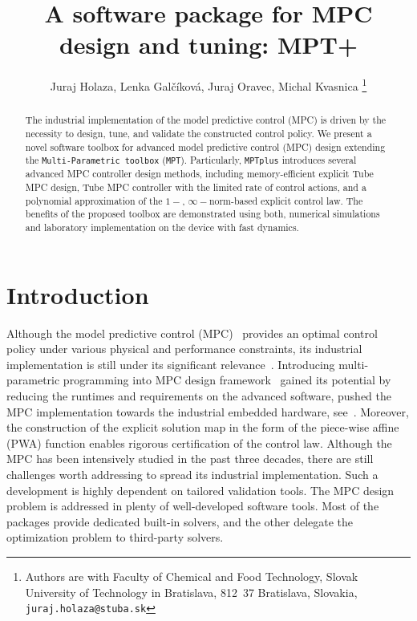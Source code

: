 \documentclass[letterpaper, 10 pt, conference]{ieeeconf}
\title{\LARGE \bf
	A software package for MPC design and tuning: MPT+
}
\author{Juraj Holaza, Lenka Gal\v{c}\'{i}kov\'{a}, Juraj Oravec, Michal Kvasnica
	\thanks{Authors are with Faculty of Chemical and Food Technology,
		Slovak University of Technology in Bratislava, 812~37 Bratislava, Slovakia,
		\texttt{juraj.holaza@stuba.sk}}
}
\begin{document}
	
	
	
	\maketitle
	\thispagestyle{empty}
	\pagestyle{empty}
	
	\begin{abstract}
		
		The industrial implementation of the model predictive control (MPC) is driven by the necessity to design, tune, and validate the constructed control policy. 
		We present a novel software toolbox for advanced model predictive control (MPC) design extending the \texttt{Multi-Parametric toolbox} (\texttt{MPT}).  Particularly, \texttt{MPTplus} introduces several advanced MPC controller design methods, including memory-efficient explicit Tube MPC design, Tube MPC controller with the limited rate of control actions, and a polynomial approximation of the $1-$, $\infty-$norm-based explicit control law. The benefits of the proposed toolbox are demonstrated using both, numerical simulations and laboratory implementation on the device with fast dynamics.  
		
	\end{abstract}
	
	\section{Introduction}
	\label{sec:introduction}
	
	Although the model predictive control (MPC)~\cite{M00, B17} provides an optimal control policy under various physical and performance constraints, its industrial implementation is still under its significant relevance~\cite{QB03}. 
	Introducing multi-parametric programming into MPC design framework~\cite{BM02} gained its potential by reducing the runtimes and requirements on the advanced software, pushed the MPC implementation towards the industrial embedded hardware, see~\cite{PK21}. Moreover, the construction of the explicit solution map in the form of the piece-wise affine (PWA) function enables rigorous certification of the control law. 
	Although the MPC has been intensively studied in the past three decades, there are still challenges worth addressing to spread its industrial implementation. Such a development is highly dependent on tailored validation tools. 
	The MPC design problem is addressed in plenty of well-developed software tools. Most of the packages provide dedicated built-in solvers, and the other delegate the optimization problem to third-party solvers. 
	
\end{document}
